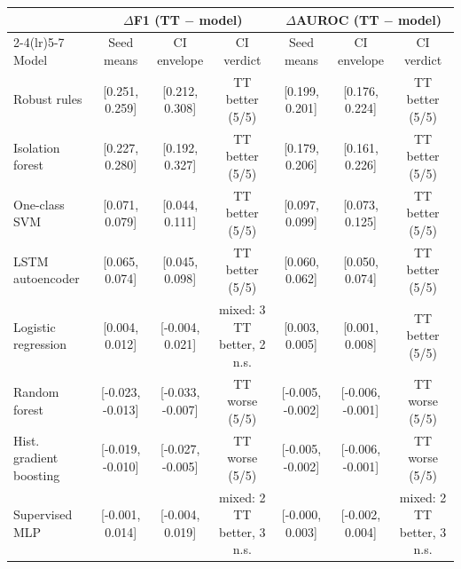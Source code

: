 \begin{tabular}{lcccccc}
\toprule
& \multicolumn{3}{c}{$\Delta$F1 (TT $-$ model)} & \multicolumn{3}{c}{$\Delta$AUROC (TT $-$ model)} \\
\cmidrule(lr){2-4}\cmidrule(lr){5-7}
Model & Seed means & CI envelope & CI verdict & Seed means & CI envelope & CI verdict \\
\midrule
Robust rules & [0.251, 0.259] & [0.212, 0.308] & TT better (5/5) & [0.199, 0.201] & [0.176, 0.224] & TT better (5/5) \\
Isolation forest & [0.227, 0.280] & [0.192, 0.327] & TT better (5/5) & [0.179, 0.206] & [0.161, 0.226] & TT better (5/5) \\
One-class SVM & [0.071, 0.079] & [0.044, 0.111] & TT better (5/5) & [0.097, 0.099] & [0.073, 0.125] & TT better (5/5) \\
LSTM autoencoder & [0.065, 0.074] & [0.045, 0.098] & TT better (5/5) & [0.060, 0.062] & [0.050, 0.074] & TT better (5/5) \\
Logistic regression & [0.004, 0.012] & [-0.004, 0.021] & mixed: 3 TT better, 2 n.s. & [0.003, 0.005] & [0.001, 0.008] & TT better (5/5) \\
Random forest & [-0.023, -0.013] & [-0.033, -0.007] & TT worse (5/5) & [-0.005, -0.002] & [-0.006, -0.001] & TT worse (5/5) \\
Hist. gradient boosting & [-0.019, -0.010] & [-0.027, -0.005] & TT worse (5/5) & [-0.005, -0.002] & [-0.006, -0.001] & TT worse (5/5) \\
Supervised MLP & [-0.001, 0.014] & [-0.004, 0.019] & mixed: 2 TT better, 3 n.s. & [-0.000, 0.003] & [-0.002, 0.004] & mixed: 2 TT better, 3 n.s. \\
\bottomrule
\end{tabular}
